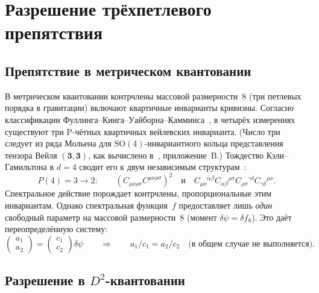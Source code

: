 \documentclass[12pt,a4paper]{article}
\theoremstyle{definition}
\theoremstyle{remark}
\newcommand{\Weylsq}{C_{\mu\nu\rho\sigma}C^{\mu\nu\rho\sigma}}
\begin{document}
\section{Разрешение трёхпетлевого препятствия}
\label{sec:three_loop}

\subsection{Препятствие в метрическом квантовании}

В метрическом квантовании контрчлены массовой размерности~8 (три
петлевых порядка в гравитации) включают квартичные инварианты кривизны.
Согласно классификации
Фуллинга--Кинга--Уайборна--Камминса~\cite{Fulling:1992vm}, в четырёх
измерениях существуют три P-чётных квартичных вейлевских
инварианта.  (Число три следует из ряда Мольена для
$\mathrm{SO}(4)$-инвариантного кольца представления тензора Вейля
$(\mathbf{3},\mathbf{3})$, как вычислено
в~\cite{Alfyorov:2026ct}, приложение~B.)  Тождество Кэли--Гамильтона
в $d = 4$ сводит его к двум независимым
структурам~\cite{Alfyorov:2026ct}:
\begin{equation}\label{eq:quartic_metric}
  P(4) = 3 \to 2: \qquad
  (\Weylsq)^2 \quad\text{и}\quad
  C_{\mu\nu}{}^{\alpha\beta}C_{\alpha\beta}{}^{\rho\sigma}
  C_{\rho\sigma}{}^{\gamma\delta}C_{\gamma\delta}{}^{\mu\nu}.
\end{equation}
Спектральное действие порождает контрчлены, пропорциональные этим
инвариантам.  Однако спектральная функция~$f$ предоставляет лишь
\emph{один} свободный параметр на массовой размерности~8 (момент
$\delta\psi = \delta f_8$).  Это даёт переопределённую систему:
\begin{equation}\label{eq:overdetermined}
  \begin{pmatrix} a_1 \\ a_2 \end{pmatrix}
  = \begin{pmatrix} c_1 \\ c_2 \end{pmatrix}\delta\psi
  \qquad \Longrightarrow \qquad
  a_1/c_1 = a_2/c_2 \quad \text{(в общем случае не выполняется)}.
\end{equation}

\subsection{Разрешение в $D^2$-квантовании}
\end{document}
